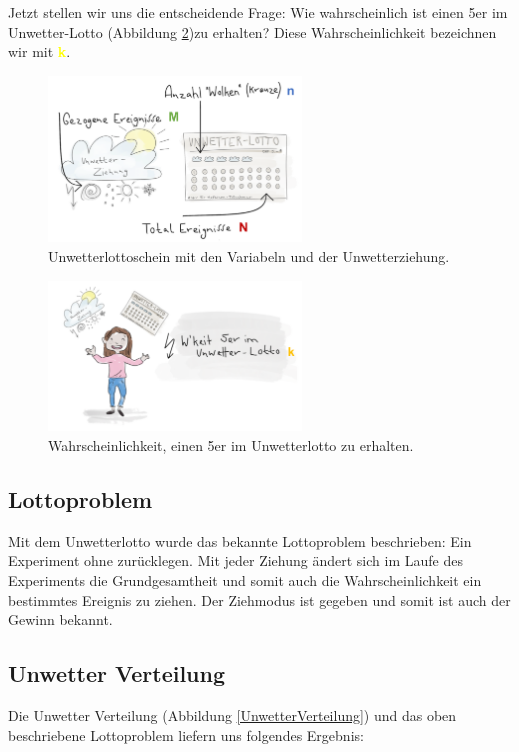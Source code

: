 \begin{refsection}
Jetzt stellen wir uns die entscheidende Frage: Wie wahrscheinlich ist einen 5er im Unwetter-Lotto (Abbildung \ref{WahrscheinlichkeitUnwetterlotto})zu erhalten? Diese Wahrscheinlichkeit bezeichnen wir mit \textcolor{yellow}{\textbf{k}}.

\begin{figure}[htbp]
\centering
\includegraphics[width=0.6\textwidth]{extrem/Lottoscheinausgefuellt.pdf}
\caption{Unwetterlottoschein mit den Variabeln und der Unwetterziehung.}
\label{Lottoscheinausgefuellt}
\end{figure}

\begin{figure}[htbp]
\centering
\includegraphics[width=0.6\textwidth]{extrem/wkeitlotto.pdf}
\caption{Wahrscheinlichkeit, einen 5er im Unwetterlotto zu erhalten.}
\label{WahrscheinlichkeitUnwetterlotto}
\end{figure}

\subsection{Lottoproblem}
Mit dem Unwetterlotto wurde das bekannte Lottoproblem beschrieben: Ein Experiment ohne zurücklegen. Mit jeder Ziehung ändert sich im Laufe des Experiments die Grundgesamtheit und somit auch die Wahrscheinlichkeit ein bestimmtes Ereignis zu ziehen. Der Ziehmodus ist gegeben und somit ist auch der Gewinn bekannt.


\subsection{Unwetter Verteilung}
Die Unwetter Verteilung (Abbildung \ref{UnwetterVerteilung}) und das oben beschriebene Lottoproblem liefern uns folgendes Ergebnis:



\end{refsection}
